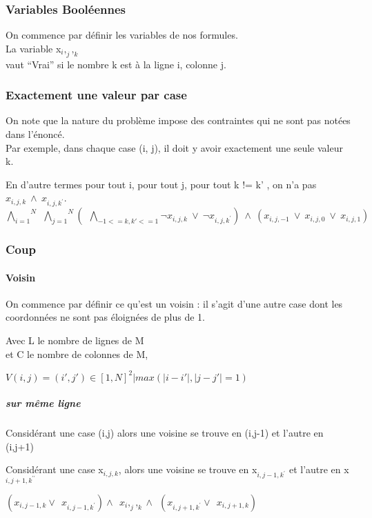 \documentclass[utf8]{article}
\begin{document}
\subsubsection{Variables  Booléennes}

On commence par définir les variables de nos formules. 
\\La variable x$_i,_j,_k$
\\vaut “Vrai” si le nombre k est à la ligne i, colonne j.

\subsubsection{Exactement une valeur par case}
On note que la nature du problème impose des contraintes qui ne sont pas notées dans l’énoncé. 
\\Par exemple, dans chaque case (i, j), il doit y avoir exactement une seule valeur k.

En d’autre termes pour tout i,
pour tout j, pour tout k != k'
, on n’a pas $x_{i,j,k} ~ \land ~ x_{i,j,{k^\prime}}$.
\newline
$\overset{N}{\underset{i=1}{\bigwedge}}
~~\overset{N}{\underset{j=1}{\bigwedge}}
(
~~\underset{-1<={k,k'}<=1}{\bigwedge}
\neg x_{i,j,k} ~ \lor ~ \neg x_{i,j,{k^\prime}})
 ~ \land ~ (x_{i,j,-1} ~ \lor ~ x_{i,j,0} ~ \lor ~ x_{i,j,1})$
\subsubsection{Coup}

\paragraph{Voisin}
On commence par définir ce qu’est un voisin : il s’agit d’une autre case dont les coordonnées ne sont pas éloignées de plus de 1.

Avec L le nombre de lignes de M
\\et C le nombre de colonnes de M,

$V (i, j) = {(i', j') \in [1, N]^2| max(|i - i'|, |j - j'| = 1)}$
 
 
\subparagraph{sur même ligne}
Considérant une case (i,j) 
alors une voisine se trouve en (i,j-1) 
et l'autre en (i,j+1) 

Considérant une case x$_{i,j,k}$, alors une voisine se trouve en x$_{i,j-1,k^\prime}$ et l'autre en x$_{i,j+1,k^{\prime\prime}}$

$(x_{i,j-1,k} \lor ~~ x_{i,j-1,k^\prime} )
\land ~~
x_i,_j,_k 
\land ~~
(x_{i,j+1,k^\prime} \lor ~~ x_{i,j+1,k})$
\end{document}
